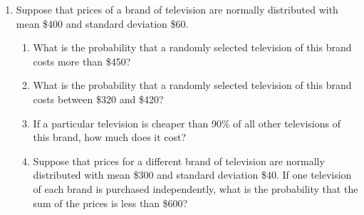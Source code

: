 \begin{enumerate}
\newpage
 \item Suppose that prices of a brand of television are normally distributed with mean \$400 and standard deviation \$60. 
    \begin{enumerate}
      \item What is the probability that a randomly selected television of this brand costs more than \$450?
      \item What is the probability that a randomly selected television of this brand costs between \$320 and \$420?
      \item If a particular television is cheaper than 90\% of all other televisions of this brand, how much does it cost?
      \item Suppose that prices for a different brand of television are normally distributed with mean \$300 and standard deviation \$40. If one television of each brand is purchased independently, what is the probability that the sum of the prices is less than \$600?
    \end{enumerate}




\end{enumerate}
